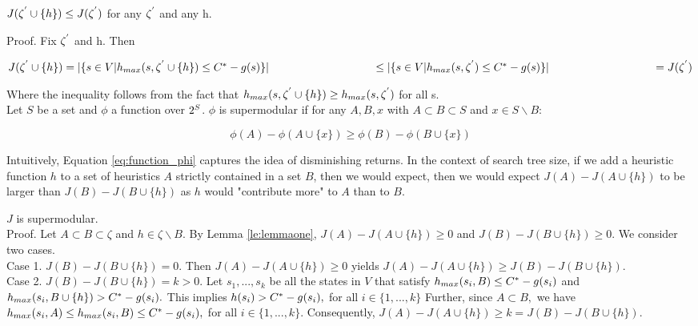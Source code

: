\begin{lemma}
$J(\zeta\sp{'} \cup \{h\}) \leq J(\zeta\sp{'})$ for any $\zeta\sp{'}$ and any h.

Proof. Fix $\zeta\sp{'}$ and h. Then

$J(\zeta\sp{'} \cup \{h\})  =  |\{s \in V | h_{max}(s, \zeta\sp{'} \cup \{h\}) \leq C\sp{*} - g(s)\}|\\
\hspace*{3.3cm} \leq  |\{s \in V | h_{max}(s,\zeta\sp{'}) \leq C\sp{*} - g(s)\}|\\
\hspace*{3.3cm} = J(\zeta\sp{'}) $

Where the inequality follows from the fact that $h_{max}(s,\zeta\sp{'} \cup \{h\}) \geq h_{max}(s,\zeta\sp{'})$ for all s. \\

Let $S$ be a set and $\phi$ a function over $2\sp{S}$. $\phi$ is supermodular if for any $A, B, x$ with $A \subset B \subset S$ and $x \in S \backslash B:$

\begin{equation}
\phi(A) - \phi(A \cup \{x\}) \geq \phi(B) - \phi(B \cup \{x\})
\label{eq:function_phi}
\end{equation}

Intuitively, Equation \ref{eq:function_phi} captures the idea of disminishing returns. In the context of search tree size, if we add a heuristic function $h$ to a set of heuristics $A$ strictly contained in a set $B$, then we would expect, then we would expect $J(A) - J(A \cup \{h\})$ to be larger than $J(B) - J(B \cup \{h\})$ as $h$ would "contribute more" to $A$ than to $B$.
\label{le:lemmaone}
\end{lemma}

\begin{lemma}
$J$ is supermodular. \\
Proof. Let $A \subset B \subset \zeta$ and $h \in \zeta \backslash B.$ By Lemma \ref{le:lemmaone}, $J(A) - J(A \cup \{h\}) \geq 0$ and $J(B) - J(B \cup \{h\}) \geq 0$. We consider two cases.\\
Case 1. $J(B) - J(B \cup \{h\}) = 0.$ Then $J(A) - J(A \cup \{h\}) \geq 0$ yields $J(A) - J(A \cup \{h\}) \geq J(B) - J(B \cup \{h\})$.\\
Case 2. $J(B) - J(B \cup \{h\}) = k > 0.$ Let $s_{1},...,s_{k}$ be all the states in $V$ that satisfy $h_{max}(s_{i}, B) \leq  C\sp{*} - g(s_{i})$ and $h_{max}(s_{i}, B \cup \{h\}) > C\sp{*} - g(s_{i}).$  This implies $h(s_{i}) > C\sp{*} - g(s_{i}),$ for all $i \in \{1,...,k\}$ Further, since $A \subset B,$ we have $h_{max}(s_{i}, A) \leq h_{max}(s_{i},B) \leq C\sp{*} - g(s_{i}),$ for all $i \in \{1,...,k\}.$ Consequently, $J(A) - J(A \cup \{h\}) \geq k = J(B) - J(B \cup \{h\}).$
\label{le:lemmatwo}
\end{lemma}

